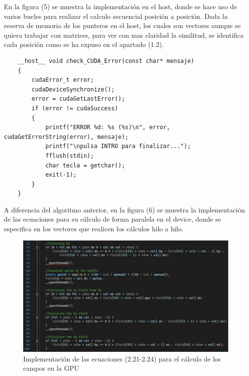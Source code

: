 \documentclass[11pt,a4paper,twoside,pdf]{article}
\numberwithin{equation}{section}
\begin{document}
En la figura (5) se muestra la implementación en el host, donde se hace uso de varios bucles para realizar el calculo secuencial posición a posición. Dada la reserva de memoria de los punteros en el host, los cuales son vectores aunque se quiera trabajar con matrices, para ver con mas claridad la similitud, se identifica cada posición como se ha expuso en el apartado (1.2).

\begin{verbatim}
	__host__ void check_CUDA_Error(const char* mensaje)
	{
		cudaError_t error;
		cudaDeviceSynchronize();
		error = cudaGetLastError();
		if (error != cudaSuccess)
		{
			printf("ERROR %d: %s (%s)\n", error, cudaGetErrorString(error), mensaje);
            printf("\npulsa INTRO para finalizar...");
            fflush(stdin);
        	char tecla = getchar();
			exit(-1);
		}
	}
\end{verbatim}


A diferencia del algoritmo anterior, en la figura (6) se muestra la implementación de las ecuaciones para su cálculo de forma paralela en el device, donde se especifica en los vectores que realicen los cálculos hilo a hilo.

\begin{figure}[h]
\centering
\includegraphics[width=15cm]{FD2D_Kernel_loop.jpg}				
\caption{Implementación de las ecuaciones (2.21-2.24) para el cálculo de los campos en la GPU }
\end{figure}
\noindent




\newpage
\end{document}
